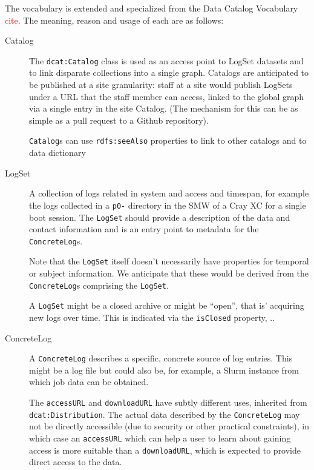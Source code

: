 The vocabulary is extended and specialized 
from the Data Catalog Vocabulary \textcolor{red}{cite}. The meaning, 
reason and usage of each are as follows:

\begin{description}
\item[Catalog] \hfill

The \texttt{dcat:Catalog} class is used as an access point to LogSet datasets and 
to link disparate collections into a single graph. Catalogs are anticipated to be 
published at a site granularity: staff at a site would publish LogSets under
a URL that the staff member can access, linked to the global graph via a single 
entry in the site Catalog. (The mechanism for this can be as simple as a pull
request to a Github repository).

\texttt{Catalog}s can use \texttt{rdfs:seeAlso} properties to link to other 
catalogs and to data dictionary

\item[LogSet] \hfill

A collection of logs related in system and access and timespan,
for example the logs collected in a \texttt{p0-} directory in the SMW of a Cray
XC for a single boot session. The \texttt{LogSet} should provide a description
of the data and contact information and is an entry point to metadata for 
the \texttt{ConcreteLog}s.

Note that the \texttt{LogSet} itself doesn't necessarily have properties for 
temporal or subject information. We anticipate that these would be derived 
from the \texttt{ConcreteLog}s comprising the \texttt{LogSet}.

A \texttt{LogSet} might be a closed archive or might be ``open'', that is' 
acquiring new logs over time. This is indicated via the \texttt{isClosed} 
property, ..

\item[ConcreteLog] \hfill

A \texttt{ConcreteLog} describes a specific, concrete source of log entries.
This might be a log file but could also be, for example, a Slurm instance
from which job data can be obtained. 

The \texttt{accessURL} and \texttt{downloadURL} have subtly different uses,
inherited from \texttt{dcat:Distribution}. The actual data described by the 
\texttt{ConcreteLog} may not be directly accessible (due to security or 
other practical constraints), in which case an \texttt{accessURL} which 
can help a user to learn about gaining access is more suitable than a 
\texttt{downloadURL}, which is expected to provide direct access to the 
data.



\end{description}
